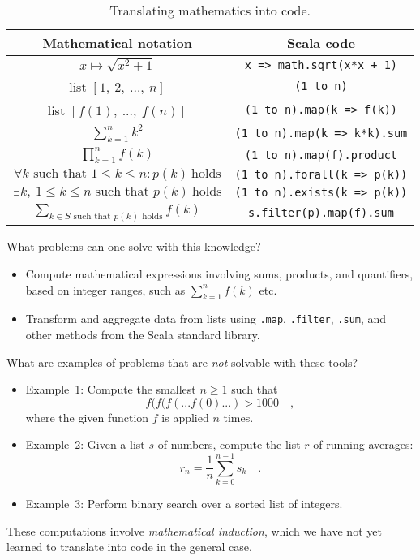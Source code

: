 \begin{table}
\begin{centering}
\begin{tabular}{|c|c|}
\hline 
\textbf{Mathematical notation} & \textbf{Scala code}\tabularnewline
\hline 
\hline 
$x\mapsto\sqrt{x^{2}+1}$ & \lstinline!x => math.sqrt(x*x + 1)!\tabularnewline
\hline 
list $\left[1,~2,~...,~n\right]$ & \lstinline!(1 to n)!\tabularnewline
\hline 
list $\left[f(1),~...,~f(n)\right]$ & \lstinline!(1 to n).map(k => f(k))!\tabularnewline
\hline 
$\sum_{k=1}^{n}k^{2}$ & \lstinline!(1 to n).map(k => k*k).sum!\tabularnewline
\hline 
$\prod_{k=1}^{n}f(k)$ & \lstinline!(1 to n).map(f).product!\tabularnewline
\hline 
$\forall k\text{ such that }1\leq k\leq n:p(k)~\text{holds}$ & \lstinline!(1 to n).forall(k => p(k))!\tabularnewline
\hline 
$\exists k,\:1\leq k\leq n\text{ such that }p(k)~\text{holds}$ & \lstinline!(1 to n).exists(k => p(k))!\tabularnewline
\hline 
${\displaystyle \sum_{k\in S\text{ such that }p(k)\text{ holds}}}f(k)$ & \lstinline!s.filter(p).map(f).sum!\tabularnewline
\hline 
\end{tabular}
\par\end{centering}
\caption{Translating mathematics into code.\label{tab:translating-mathematics-into-code}}
\end{table}

What problems can one solve with this knowledge?
\begin{itemize}
\item Compute mathematical expressions involving sums, products, and quantifiers,
based on integer ranges, such as $\sum_{k=1}^{n}f(k)$ etc.
\item Transform and aggregate data from lists using \lstinline!.map!, \lstinline!.filter!,\textbf{
}\lstinline!.sum!, and other methods from the Scala standard library.
\end{itemize}
What are examples of problems that are \emph{not} solvable with these
tools?
\begin{itemize}
\item Example~1: Compute the smallest $n\geq1$ such that 
\[
f(f(f(...f(0)...)>1000\quad,
\]
where the given function $f$ is applied $n$ times.
\item Example~2: Given a list $s$ of numbers, compute the list $r$ of
running averages: 
\[
r_{n}=\frac{1}{n}\sum_{k=0}^{n-1}s_{k}\quad.
\]
\item Example~3: Perform binary search over a sorted list of integers.
\end{itemize}
These computations involve \emph{mathematical induction},
which we have not yet learned to translate into code in the general
case.

